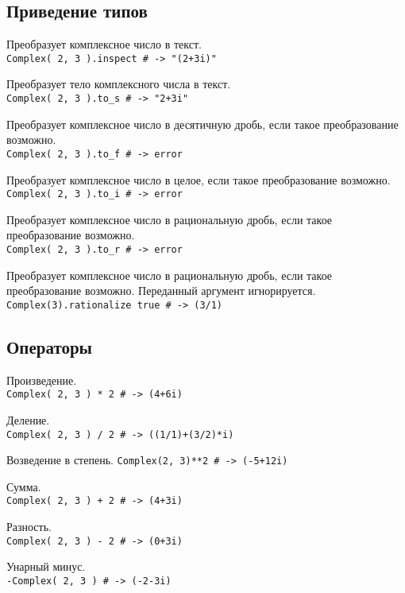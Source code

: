 \subsection*{Приведение типов}

\begin{methodlist}
  Преобразует комплексное число в текст. 
  \\\verb!Complex( 2, 3 ).inspect # -> "(2+3i)"!
 
  Преобразует тело комплексного числа в текст. 
  \\\verb!Complex( 2, 3 ).to_s # -> "2+3i"!
 
  Преобразует комплексное число в десятичную дробь, если такое преобразование возможно. 
  \\\verb!Complex( 2, 3 ).to_f # -> error!
 
  Преобразует комплексное число в целое, если такое преобразование возможно. 
  \\\verb!Complex( 2, 3 ).to_i # -> error!
 
  Преобразует комплексное число в рациональную дробь, если такое преобразование возможно. 
  \\\verb!Complex( 2, 3 ).to_r # -> error!
 
  Преобразует комплексное число в рациональную дробь, если такое преобразование возможно. Переданный аргумент игнорируется. 
  \\\verb!Complex(3).rationalize true # -> (3/1)!
\end{methodlist}

\subsection*{Операторы} 

\begin{methodlist}
  Произведение. 
  \\\verb!Complex( 2, 3 ) * 2 # -> (4+6i)!
 
  Деление. 
  \\\verb!Complex( 2, 3 ) / 2 # -> ((1/1)+(3/2)*i)!
 
  Возведение в степень. 
  \verb!Complex(2, 3)**2 # -> (-5+12i)!
 
  Сумма. 
  \\\verb!Complex( 2, 3 ) + 2 # -> (4+3i)!
 
  Разность. 
  \\\verb!Complex( 2, 3 ) - 2 # -> (0+3i)!
 
  Унарный минус. 
  \\\verb!-Complex( 2, 3 ) # -> (-2-3i)!
\end{methodlist}


